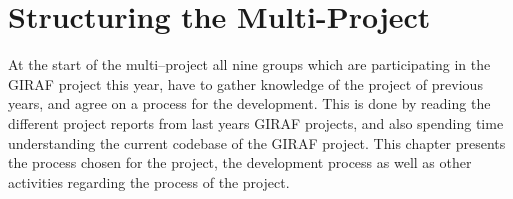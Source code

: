 \chapter{Structuring the Multi-Project}

At the start of the multi--project all nine groups which are participating in the GIRAF project this year, have to gather knowledge of the project of previous years, and agree on a process for the development.
This is done by reading the different project reports from last years GIRAF projects, and also spending time understanding the current codebase of the GIRAF project.
This chapter presents the process chosen for the project, the development process as well as other activities regarding the process of the project.

